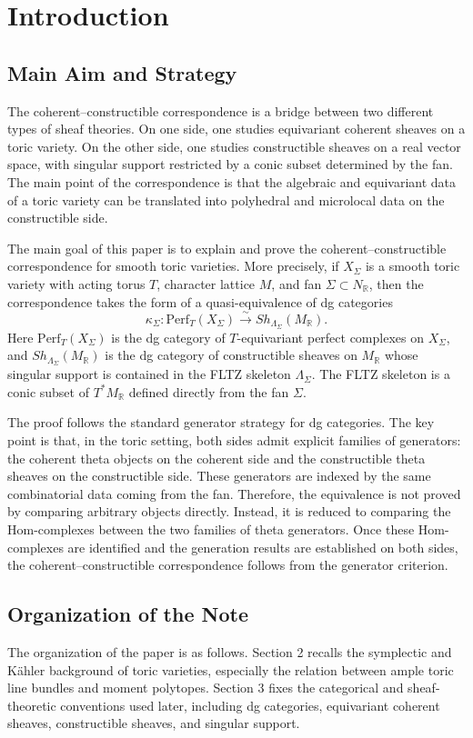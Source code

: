 
\section{Introduction}
\subsection{Main Aim and Strategy}
The coherent--constructible correspondence is a bridge between two different
types of sheaf theories. On one side, one studies equivariant coherent sheaves
on a toric variety. On the other side, one studies constructible sheaves on a
real vector space, with singular support restricted by a conic subset determined
by the fan. The main point of the correspondence is that the algebraic and
equivariant data of a toric variety can be translated into polyhedral and
microlocal data on the constructible side.

The main goal of this paper is to explain and prove the coherent--constructible
correspondence for smooth toric varieties. More precisely, if \(X_\Sigma\) is a
smooth toric variety with acting torus \(T\), character lattice \(M\), and fan
\(\Sigma\subset N_{\mathbb R}\), then the correspondence takes the form of a
quasi-equivalence of dg categories
\[
\kappa_\Sigma:\mathrm{Perf}_T(X_\Sigma)
\overset{\sim}{\longrightarrow}
Sh_{\Lambda_\Sigma}(M_{\mathbb R}).
\]
Here \(\mathrm{Perf}_T(X_\Sigma)\) is the dg category of \(T\)-equivariant
perfect complexes on \(X_\Sigma\), and \(Sh_{\Lambda_\Sigma}(M_{\mathbb R})\)
is the dg category of constructible sheaves on \(M_{\mathbb R}\) whose singular
support is contained in the FLTZ skeleton \(\Lambda_\Sigma\). The FLTZ skeleton
is a conic subset of \(T^*M_{\mathbb R}\) defined directly from the fan
\(\Sigma\).

The proof follows the standard generator strategy for dg categories. The key point is that, in the toric setting, both sides admit explicit families of generators: the coherent theta objects on the coherent side and the constructible theta sheaves on the constructible side. These generators are indexed by the same combinatorial data coming from the fan. Therefore, the equivalence is not proved by comparing arbitrary objects directly. Instead, it is reduced to comparing the Hom-complexes between the two families of theta generators. Once these Hom-complexes are identified and the generation results are established on both sides, the coherent--constructible correspondence follows from the generator criterion.
\subsection{Organization of the Note}
The organization of the paper is as follows. Section 2 recalls the symplectic and Kähler background of toric varieties, especially the relation between ample toric line bundles and moment polytopes. Section 3 fixes the categorical and sheaf-theoretic conventions used later, including dg categories, equivariant coherent sheaves, constructible sheaves, and singular support.

